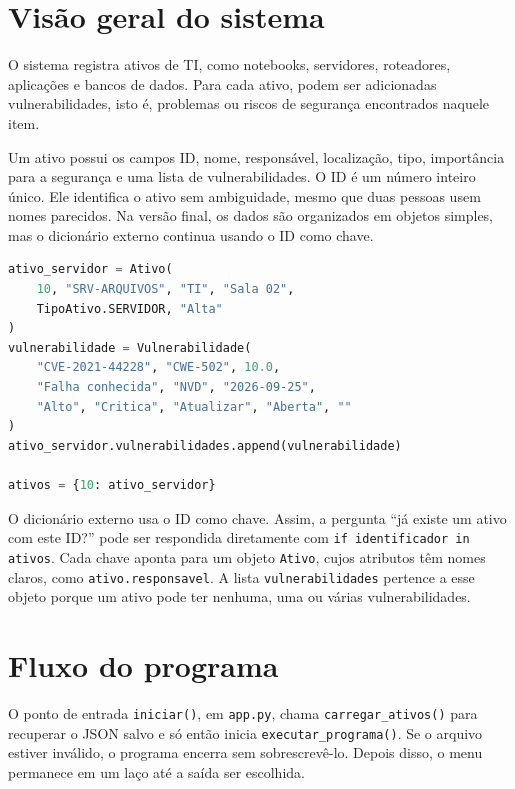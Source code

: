 \documentclass[11pt,a4paper]{article}
\begin{document}
\section{Visão geral do sistema}

O sistema registra ativos de TI, como notebooks, servidores, roteadores, aplicações e bancos de dados. Para cada ativo, podem ser adicionadas vulnerabilidades, isto é, problemas ou riscos de segurança encontrados naquele item.

Um ativo possui os campos ID, nome, responsável, localização, tipo, importância para a segurança e uma lista de vulnerabilidades. O ID é um número inteiro único. Ele identifica o ativo sem ambiguidade, mesmo que duas pessoas usem nomes parecidos. Na versão final, os dados são organizados em objetos simples, mas o dicionário externo continua usando o ID como chave.

\begin{lstlisting}[language=Python,caption={Formato dos dados na memória}]
ativo_servidor = Ativo(
    10, "SRV-ARQUIVOS", "TI", "Sala 02",
    TipoAtivo.SERVIDOR, "Alta"
)
vulnerabilidade = Vulnerabilidade(
    "CVE-2021-44228", "CWE-502", 10.0,
    "Falha conhecida", "NVD", "2026-09-25",
    "Alto", "Critica", "Atualizar", "Aberta", ""
)
ativo_servidor.vulnerabilidades.append(vulnerabilidade)

ativos = {10: ativo_servidor}
\end{lstlisting}

O dicionário externo usa o ID como chave. Assim, a pergunta ``já existe um ativo com este ID?'' pode ser respondida diretamente com \texttt{if identificador in ativos}. Cada chave aponta para um objeto \texttt{Ativo}, cujos atributos têm nomes claros, como \texttt{ativo.responsavel}. A lista \texttt{vulnerabilidades} pertence a esse objeto porque um ativo pode ter nenhuma, uma ou várias vulnerabilidades.

\section{Fluxo do programa}

O ponto de entrada \texttt{iniciar()}, em \texttt{app.py}, chama \texttt{carregar\_ativos()} para recuperar o JSON salvo e só então inicia \texttt{executar\_programa()}. Se o arquivo estiver inválido, o programa encerra sem sobrescrevê-lo. Depois disso, o menu permanece em um laço até a saída ser escolhida.
\end{document}
